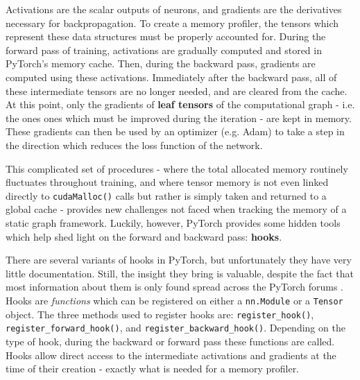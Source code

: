 \documentclass[12pt,letterpaper]{article}
\begin{document}
Activations are the scalar outputs of neurons, and gradients are the derivatives necessary for backpropagation. To create a memory profiler, the tensors which represent these data structures must be properly accounted for. During the forward pass of training, activations are gradually computed and stored in PyTorch's memory cache. Then, during the backward pass, gradients are computed using these activations. Immediately after the backward pass, all of these intermediate tensors are no longer needed, and are cleared from the cache. At this point, only the gradients of \textbf{leaf tensors} \cite{pytorch_doc_leaf_requires_grad} of the computational graph - i.e. the ones ones which must be improved during the iteration - are kept in memory. These gradients can then be used by an optimizer (e.g. Adam) to take a step in the direction which reduces the loss function of the network.
\par 

This complicated set of procedures - where the total allocated memory routinely fluctuates throughout training, and where tensor memory is not even linked directly to \texttt{cudaMalloc()} calls but rather is simply taken and returned to a global cache - provides new challenges not faced when tracking the memory of a static graph framework. Luckily, however, PyTorch provides some hidden tools which help shed light on the forward and backward pass: \textbf{hooks}.
\par 

There are several variants of hooks in PyTorch, but unfortunately they have very little documentation. Still, the insight they bring is valuable, despite the fact that most information about them is only found spread across the PyTorch forums \cite{pytorch_forum}. Hooks are \textit{functions} which can be registered on either a \texttt{nn.Module} or a \texttt{Tensor} object. The three methods used to register hooks are: \texttt{register\_hook()}, \texttt{register\_forward\_hook()}, and \texttt{register\_backward\_hook()}. Depending on the type of hook, during the backward or forward pass these functions are called. Hooks allow direct access to the intermediate activations and gradients at the time of their creation - exactly what is needed for a memory profiler.
\par 
\end{document}
